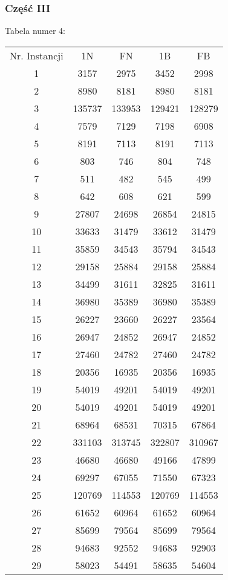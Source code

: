 \documentclass{article}
\begin{document}
\subsubsection{Część III}
Tabela numer 4:
\begin{table}[h!]
\centering
\begin{tabular}{c||c|c|c|c}
Nr. Instancji & 1N & FN & 1B & FB \\
1 & 3157 & 2975 & 3452 & 2998 \\
2 & 8980 & 8181 & 8980 & 8181 \\
3 & 135737 & 133953 & 129421 & 128279 \\
4 & 7579 & 7129 & 7198 & 6908 \\
5 & 8191 & 7113 & 8191 & 7113 \\
6 & 803 & 746 & 804 & 748 \\
7 & 511 & 482 & 545 & 499 \\
8 & 642 & 608 & 621 & 599 \\
9 & 27807 & 24698 & 26854 & 24815 \\
10 & 33633 & 31479 & 33612 & 31479 \\
11 & 35859 & 34543 & 35794 & 34543 \\
12 & 29158 & 25884 & 29158 & 25884 \\
13 & 34499 & 31611 & 32825 & 31611 \\
14 & 36980 & 35389 & 36980 & 35389 \\
15 & 26227 & 23660 & 26227 & 23564 \\
16 & 26947 & 24852 & 26947 & 24852 \\
17 & 27460 & 24782 & 27460 & 24782 \\
18 & 20356 & 16935 & 20356 & 16935 \\
19 & 54019 & 49201 & 54019 & 49201 \\
20 & 54019 & 49201 & 54019 & 49201 \\
21 & 68964 & 68531 & 70315 & 67864 \\
22 & 331103 & 313745 & 322807 & 310967 \\
23 & 46680 & 46680 & 49166 & 47899 \\
24 & 69297 & 67055 & 71550 & 67323 \\
25 & 120769 & 114553 & 120769 & 114553 \\
26 & 61652 & 60964 & 61652 & 60964 \\
27 & 85699 & 79564 & 85699 & 79564 \\
28 & 94683 & 92552 & 94683 & 92903 \\
29 & 58023 & 54491 & 58635 & 54604 \\

\end{tabular}
\end{table}
\end{document}
